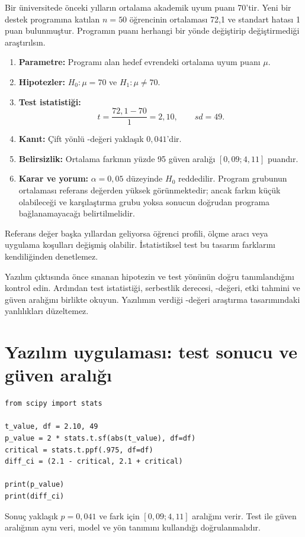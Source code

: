 Bir üniversitede önceki yılların ortalama akademik uyum puanı 70'tir. Yeni bir
destek programına katılan $n=50$ öğrencinin ortalaması 72,1 ve standart hatası
1 puan bulunmuştur. Programın puanı herhangi bir yönde değiştirip
değiştirmediği araştırılsın.

\begin{enumerate}
  \item \textbf{Parametre:} Programı alan hedef evrendeki ortalama uyum puanı $\mu$.
  \item \textbf{Hipotezler:} $H_0:\mu=70$ ve $H_1:\mu\neq70$.
  \item \textbf{Test istatistiği:}
  \[
  t=\frac{72{,}1-70}{1}=2{,}10,\qquad sd=49.
  \]
  \item \textbf{Kanıt:} Çift yönlü \pval-değeri yaklaşık $0{,}041$'dir.
  \item \textbf{Belirsizlik:} Ortalama farkının yüzde 95 güven aralığı
  $[0{,}09;4{,}11]$ puandır.
  \item \textbf{Karar ve yorum:} $\alpha=0{,}05$ düzeyinde $H_0$ reddedilir.
  Program grubunun ortalaması referans değerden yüksek görünmektedir; ancak
  farkın küçük olabileceği ve karşılaştırma grubu yoksa sonucun doğrudan
  programa bağlanamayacağı belirtilmelidir.
\end{enumerate}

\begin{researchbox}
Referans değer başka yıllardan geliyorsa öğrenci profili, ölçme aracı veya
uygulama koşulları değişmiş olabilir. İstatistiksel test bu tasarım farklarını
kendiliğinden denetlemez.
\end{researchbox}

\begin{outputguidebox}
Yazılım çıktısında önce sınanan hipotezin ve test yönünün doğru tanımlandığını
kontrol edin. Ardından test istatistiği, serbestlik derecesi, \pval-değeri, etki
tahmini ve güven aralığını birlikte okuyun. Yazılımın verdiği \pval-değeri
araştırma tasarımındaki yanlılıkları düzeltemez.
\end{outputguidebox}

\section{Yazılım uygulaması: test sonucu ve güven aralığı}

\begin{softwarebox}
\begin{lstlisting}
from scipy import stats

t_value, df = 2.10, 49
p_value = 2 * stats.t.sf(abs(t_value), df=df)
critical = stats.t.ppf(.975, df=df)
diff_ci = (2.1 - critical, 2.1 + critical)

print(p_value)
print(diff_ci)
\end{lstlisting}
Sonuç yaklaşık $p=0{,}041$ ve fark için $[0{,}09;4{,}11]$ aralığını verir.
Test ile güven aralığının aynı veri, model ve yön tanımını kullandığı
doğrulanmalıdır.
\end{softwarebox}

